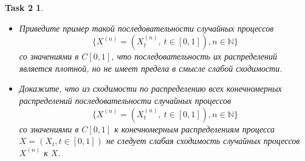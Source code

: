 \documentclass[12pt,a4paper]{extarticle}
\newtheorem*{task2}{Task 2}
\newcommand{\N}{\mathbb{N}}
\begin{document}
\begin{task2}
	\
	\begin{itemize}
		\item[a)] Приведите пример такой последовательности случайных процессов
		\[
			\{X^{(n)} = (X_t^{(n)},~ t \in [0, 1]), n \in \N\}
		\]
		со значениями в $C[0, 1]$, что последовательность их распределений является плотной, но не имеет предела в смысле слабой сходимости.
		\item[b)] Докажите, что из сходимости по распределению всех конечномерных распределений последовательности случайных процессов
		\[
			\{X^{(n)} = (X_t^{(n)},~ t \in [0, 1]), n \in \N\}
		\]
		со значениями в $C[0, 1]$ к конечномерным распределениям процесса $X =
		(X_t , t \in [0, 1])$ не следует слабая сходимость случайных процессов $X^{(n)}$ к	$X$.
	\end{itemize}
\end{task2}
\end{document}
